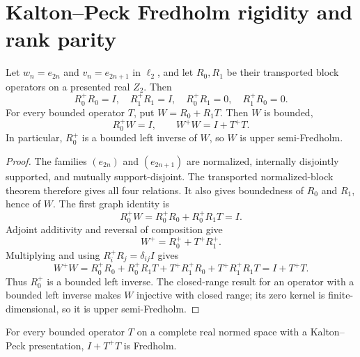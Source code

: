 \section{Kalton--Peck Fredholm rigidity and rank parity}

\begin{lemma}\label{lem:even-odd-blocks}
Let $w_n=e_{2n}$ and $v_n=e_{2n+1}$ in $\ell_2$, and let $R_0,R_1$ be their transported block
operators on a presented real $Z_2$.  Then
\[
  R_0^+R_0=I,
  \quad R_1^+R_1=I,
  \quad R_0^+R_1=0,
  \quad R_1^+R_0=0.
\]
For every bounded operator $T$, put $W=R_0+R_1T$.  Then $W$ is bounded,
\[
  R_0^+W=I,
  \qquad
  W^+W=I+T^+T.
\]
In particular, $R_0^+$ is a bounded left inverse of $W$, so $W$ is upper semi-Fredholm.
\leanok
\end{lemma}

\begin{proof}
The families $(e_{2n})$ and $(e_{2n+1})$ are normalized, internally disjointly supported, and
mutually support-disjoint.  The transported normalized-block theorem therefore gives all four
relations.  It also gives boundedness of $R_0$ and $R_1$, hence of $W$.  The first graph identity is
\[
  R_0^+W=R_0^+R_0+R_0^+R_1T=I.
\]
Adjoint additivity and reversal of composition give
\[
  W^+=R_0^++T^+R_1^+.
\]
Multiplying and using $R_i^+R_j=\delta_{ij}I$ gives
\[
  W^+W
  =R_0^+R_0+R_0^+R_1T+T^+R_1^+R_0+T^+R_1^+R_1T
  =I+T^+T.
\]
Thus $R_0^+$ is a bounded left inverse.  The closed-range result for an operator with a bounded
left inverse makes $W$ injective with closed range; its zero kernel is finite-dimensional, so it is
upper semi-Fredholm.
\end{proof}

\begin{proposition}\label{prop:graph-fredholm}
For every bounded operator $T$ on a complete real normed space with a Kalton--Peck presentation,
$I+T^+T$ is Fredholm.
\leanok
\end{proposition}

